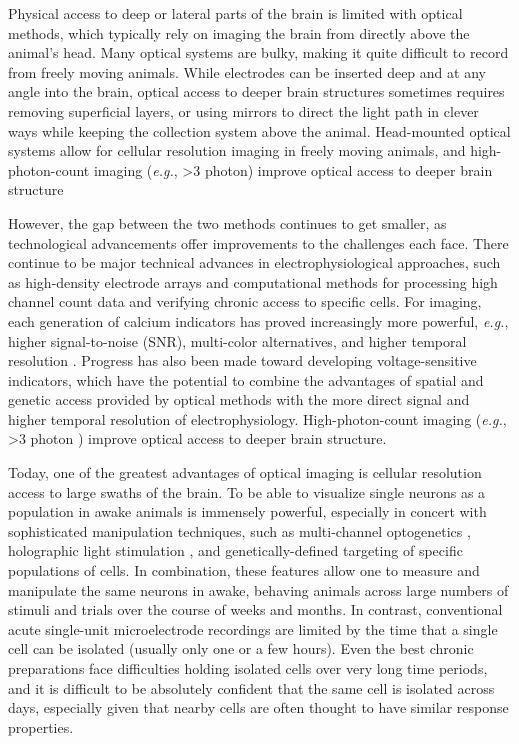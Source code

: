Physical access to deep or lateral parts of the brain is limited with optical methods, which typically rely on imaging the brain from directly above the animal's head. Many optical systems are bulky, making it quite difficult to record from freely moving animals. While electrodes can be inserted deep and at any angle into the brain, optical access to deeper brain structures sometimes requires removing superficial layers\cite{REFREF}, or using mirrors to direct the light path in clever ways while keeping the collection system above the animal\cite{Andermann2013}. Head-mounted optical systems allow for cellular resolution imaging in freely moving animals\cite{miniscope, Helmchen2001, Sawinski2009, 3photonmini}, and high-photon-count imaging (\textit{e.g.}, >3 photon\cite{REFREF}) improve optical access to deeper brain structure

However, the gap between the two methods continues to get smaller, as technological advancements offer improvements to the challenges each face. There continue to be major technical advances in electrophysiological approaches, such as high-density electrode arrays\cite{REFREF} and computational methods for processing high channel count data and verifying chronic access to specific cells\cite{REFREF}. For imaging, each generation of calcium indicators has proved increasingly more powerful, \textit{e.g.}, higher signal-to-noise (SNR), multi-color alternatives, and higher temporal resolution \cite{Akerboom2012OptimizationImaging, Chen2013UltrasensitiveActivity, REFREF}. Progress has also been made toward developing voltage-sensitive indicators\cite{REFREF, Adam Cohen, etc}, which have the potential to combine the advantages of spatial and genetic access provided by optical methods with the more direct signal and higher temporal resolution of electrophysiology. High-photon-count imaging (\textit{e.g.}, >3 photon \cite{REFREF}) improve optical access to deeper brain structure.

Today, one of the greatest advantages of optical imaging is cellular resolution access to large swaths of the brain. To be able to visualize single neurons as a population in awake animals is immensely powerful, especially in concert with sophisticated manipulation techniques, such as multi-channel optogenetics \cite{REFREF}, holographic light stimulation \cite{REFREF}, and genetically-defined targeting of specific populations of cells. In combination, these features allow one to measure and manipulate the same neurons in awake, behaving animals across large numbers of stimuli and trials over the course of weeks and months. In contrast, conventional acute single-unit microelectrode recordings are limited by the time that a single cell can be isolated (usually only one or a few hours). Even the best chronic preparations face difficulties holding isolated cells over very long time periods, and it is difficult to be absolutely confident that the same cell is isolated across days, especially given that nearby cells are often thought to have similar response properties.

